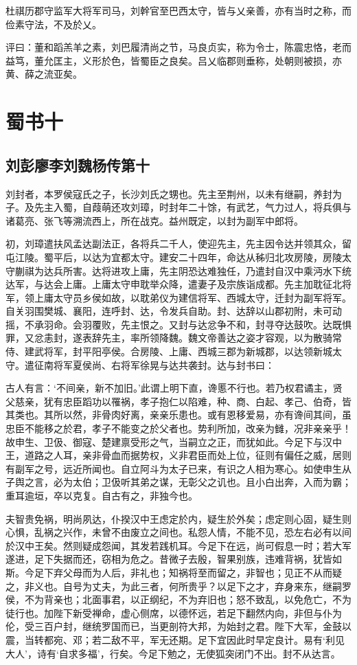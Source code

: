 \documentclass[12pt,UTF8]{ctexbook}
\begin{document}
杜祺历郡守监军大将军司马，刘幹官至巴西太守，皆与乂亲善，亦有当时之称，而俭素守法，不及於乂。

评曰：董和蹈羔羊之素，刘巴履清尚之节，马良贞实，称为令士，陈震忠恪，老而益笃，董允匡主，义形於色，皆蜀臣之良矣。吕乂临郡则垂称，处朝则被损，亦黄、薛之流亚矣。

\part{蜀书十}
\chapter{刘彭廖李刘魏杨传第十}

刘封者，本罗侯寇氏之子，长沙刘氏之甥也。先主至荆州，以未有继嗣，养封为子。及先主入蜀，自葭萌还攻刘璋，时封年二十馀，有武艺，气力过人，将兵俱与诸葛亮、张飞等溯流西上，所在战克。益州既定，以封为副军中郎将。

初，刘璋遣扶风孟达副法正，各将兵二千人，使迎先主，先主因令达并领其众，留屯江陵。蜀平后，以达为宜都太守。建安二十四年，命达从秭归北攻房陵，房陵太守蒯祺为达兵所害。达将进攻上庸，先主阴恐达难独任，乃遣封自汉中乘沔水下统达军，与达会上庸。上庸太守申耽举众降，遣妻子及宗族诣成都。先主加耽征北将军，领上庸太守员乡侯如故，以耽弟仪为建信将军、西城太守，迁封为副军将军。自关羽围樊城、襄阳，连呼封、达，令发兵自助。封、达辞以山郡初附，未可动摇，不承羽命。会羽覆败，先主恨之。又封与达忿争不和，封寻夺达鼓吹。达既惧罪，又忿恚封，遂表辞先主，率所领降魏。魏文帝善达之姿才容观，以为散骑常侍、建武将军，封平阳亭侯。合房陵、上庸、西城三郡为新城郡，以达领新城太守。遣征南将军夏侯尚、右将军徐晃与达共袭封。达与封书曰：

古人有言：‘不间亲，新不加旧。’此谓上明下直，谗慝不行也。若乃权君谲主，贤父慈亲，犹有忠臣蹈功以罹祸，孝子抱仁以陷难，种、商、白起、孝己、伯奇，皆其类也。其所以然，非骨肉好离，亲亲乐患也。或有恩移爱易，亦有谗间其间，虽忠臣不能移之於君，孝子不能变之於父者也。势利所加，改亲为雠，况非亲亲乎！故申生、卫伋、御寇、楚建禀受形之气，当嗣立之正，而犹如此。今足下与汉中王，道路之人耳，亲非骨血而据势权，义非君臣而处上位，征则有偏任之威，居则有副军之号，远近所闻也。自立阿斗为太子已来，有识之人相为寒心。如使申生从子舆之言，必为太伯；卫伋听其弟之谋，无彰父之讥也。且小白出奔，入而为霸；重耳逾垣，卒以克复。自古有之，非独今也。

夫智贵免祸，明尚夙达，仆揆汉中王虑定於内，疑生於外矣；虑定则心固，疑生则心惧，乱祸之兴作，未曾不由废立之间也。私怨人情，不能不见，恐左右必有以间於汉中王矣。然则疑成怨闻，其发若践机耳。今足下在远，尚可假息一时；若大军遂进，足下失据而还，窃相为危之。昔微子去殷，智果别族，违难背祸，犹皆如斯。今足下弃父母而为人后，非礼也；知祸将至而留之，非智也；见正不从而疑之，非义也。自号为丈夫，为此三者，何所贵乎？以足下之才，弃身来东，继嗣罗侯，不为背亲也；北面事君，以正纲纪，不为弃旧也；怒不致乱，以免危亡，不为徒行也。加陛下新受禅命，虚心侧席，以德怀远，若足下翻然内向，非但与仆为伦，受三百户封，继统罗国而已，当更剖符大邦，为始封之君。陛下大军，金鼓以震，当转都宛、邓；若二敌不平，军无还期。足下宜因此时早定良计。易有‘利见大人’，诗有‘自求多福’，行矣。今足下勉之，无使狐突闭门不出。封不从达言。
\end{document}
